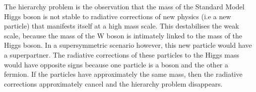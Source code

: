 The hierarchy problem is the observation that the mass of the Standard Model Higgs boson is not stable to radiative corrections of new physics (i.e a new particle) that manifests itself at a high mass scale. This destabilises the weak scale, because the mass of the W boson is intimately linked to the mass of the Higgs boson. In a supersymmetric scenario however, this new particle would have a superpartner. The radiative corrections of these particles to the Higgs mass would have opposite signs because one particle is a boson and the other a fermion. 
If the particles have approximately the same mass, then the radiative corrections approximately cancel and the hierarchy problem disappears. 


 

 
